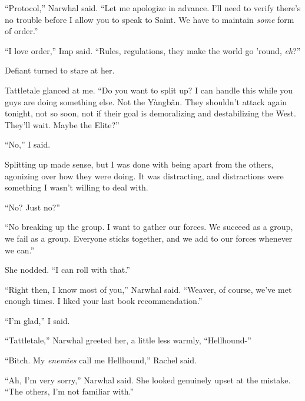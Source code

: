 ``Protocol,'' Narwhal said.  ``Let me apologize in advance.  I'll need to verify there's no trouble before I allow you to speak to Saint.  We have to maintain \emph{some} form of order.''



``I love order,'' Imp said.  ``Rules, regulations, they make the world go 'round, \emph{eh}?''



Defiant turned to stare at her.



Tattletale glanced at me.  ``Do you want to split up?  I can handle this while you guys are doing something else.  Not the Y\`{a}ngb\v{a}n.  They shouldn't attack again tonight, not so soon, not if their goal is demoralizing and destabilizing the West.  They'll wait.  Maybe the Elite?''



``No,'' I said.



Splitting up made sense, but I was done with being apart from the others, agonizing over how they were doing.  It was distracting, and distractions were something I wasn't willing to deal with.



``No?  Just no?''



``No breaking up the group.  I want to gather our forces.  We succeed as a group, we fail as a group.  Everyone sticks together, and we add to our forces whenever we can.''



She nodded.  ``I can roll with that.''



``Right then, I know most of you,'' Narwhal said.  ``Weaver, of course, we've met enough times.  I liked your last book recommendation.''



``I'm glad,'' I said.



``Tattletale,'' Narwhal greeted her, a little less warmly, ``Hellhound-''



``Bitch.  My \emph{enemies} call me Hellhound,'' Rachel said.



``Ah, I'm very sorry,'' Narwhal said.  She looked genuinely upset at the mistake.  ``The others, I'm not familiar with.''



